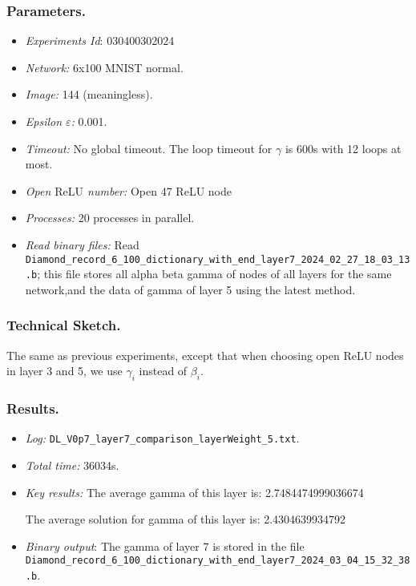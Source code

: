 \documentclass{llncs}
\newcommand{\ReLU}{\mathrm{ReLU}}
\begin{document}
\subsubsection*{Parameters.}

\begin{itemize}
	\item\emph{Experiments Id}: 030400302024
	
	\item\emph{Network:} 6x100 MNIST normal. 
	
	\item\emph{Image:} 144 (meaningless).
	
	\item\emph{Epsilon $\varepsilon$:} 0.001.
	
	\item\emph{Timeout:} No global timeout. The loop timeout for $\gamma$ is 600s with 12 loops at most.
	
	\item\emph{Open $\ReLU$ number:} Open 47 ReLU node
	
	\item\emph{Processes:} 20 processes in parallel. 
	
	\item\emph{Read binary files:} Read \verb*|Diamond_record_6_100_dictionary_with_end_layer7_2024_02_27_18_03_13.b|; this file stores all alpha beta gamma of nodes of all layers for the same network,and the data of gamma of layer 5 using the latest method. 
\end{itemize}


\subsubsection*{Technical Sketch.}

The same as previous experiments, except that when choosing open ReLU nodes in layer 3 and 5, we use $\gamma_i$ instead of $\beta_i$.



\subsubsection*{Results.}


\begin{itemize}
	\item \emph{Log:} \verb*|DL_V0p7_layer7_comparison_layerWeight_5.txt|.
	
	\item \emph{Total time:} 36034s.
	
	\item \emph{Key results:}  The average gamma of this layer is:  2.7484474999036674
	
	The average solution for gamma of this layer is:  2.4304639934792
	
	\item  \emph{Binary output}: The gamma of layer 7 is stored in the file \verb*|Diamond_record_6_100_dictionary_with_end_layer7_2024_03_04_15_32_38.b|.
	
\end{itemize}
\end{document}
